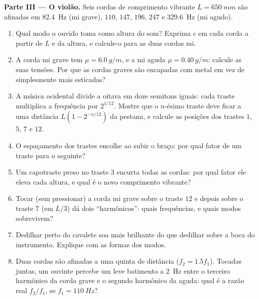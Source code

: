 \begin{problem}
\medskip
\noindent\textbf{Parte III --- O violão.}
Seis cordas de comprimento vibrante $L = \qty{650}{mm}$ são afinadas em
\qty{82.4}{Hz} (mi grave), $110$, $147$, $196$, $247$ e \qty{329.6}{Hz}
(mi agudo).
\begin{enumerate}[resume]
  \item Qual modo o ouvido toma como altura do som? Exprima $c$ em cada
        corda a partir de $L$ e da altura, e calcule-o para as duas cordas mi.
  \item A corda mi grave tem $\mu = \qty{6.0}{g/m}$, e a mi aguda
        $\mu = \qty{0.40}{g/m}$: calcule as suas tensões. Por que as cordas
        graves são encapadas com metal em vez de simplesmente mais esticadas?
  \item A música ocidental divide a oitava em doze semitons iguais:
        cada traste multiplica a frequência por $2^{1/12}$. Mostre que o
        $n$-ésimo traste deve ficar a uma distância $L(1 - 2^{-n/12})$ da
        pestana, e calcule as posições dos trastes $1$, $5$, $7$ e $12$.
  \item O espaçamento dos trastes encolhe ao subir o braço: por qual fator de um
        traste para o seguinte?
  \item Um capotraste preso no traste $3$ encurta todas as cordas: por qual
        fator ele eleva cada altura, e qual é o novo comprimento
        vibrante?
  \item Tocar (sem pressionar) a corda mi grave sobre o traste $12$ e depois
        sobre o traste $7$ (em $L/3$) dá dois ``harmônicos'': quais
        frequências, e quais modos sobrevivem?
  \item Dedilhar perto do cavalete soa mais brilhante do que dedilhar sobre a
        boca do instrumento. Explique com as formas dos modos.
  \item Duas cordas são afinadas a uma quinta de distância ($f_2 = 1.5f_1$). Tocadas
        juntas, um ouvinte percebe um leve batimento a \qty{2}{Hz}
        entre o terceiro harmônico da corda grave e o segundo
        harmônico da aguda: qual é a razão real $f_2/f_1$, se
        $f_1 = \qty{110}{Hz}$?
\end{enumerate}


\end{problem}
